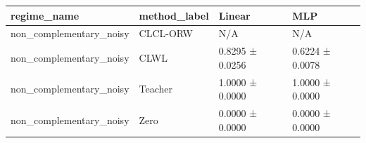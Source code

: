 \begin{tabular}{llll}
\toprule
regime_name & method_label & Linear & MLP \\
\midrule
non_complementary_noisy & CLCL-ORW & N/A & N/A \\
non_complementary_noisy & CLWL & 0.8295 ± 0.0256 & 0.6224 ± 0.0078 \\
non_complementary_noisy & Teacher & 1.0000 ± 0.0000 & 1.0000 ± 0.0000 \\
non_complementary_noisy & Zero & 0.0000 ± 0.0000 & 0.0000 ± 0.0000 \\
\bottomrule
\end{tabular}

